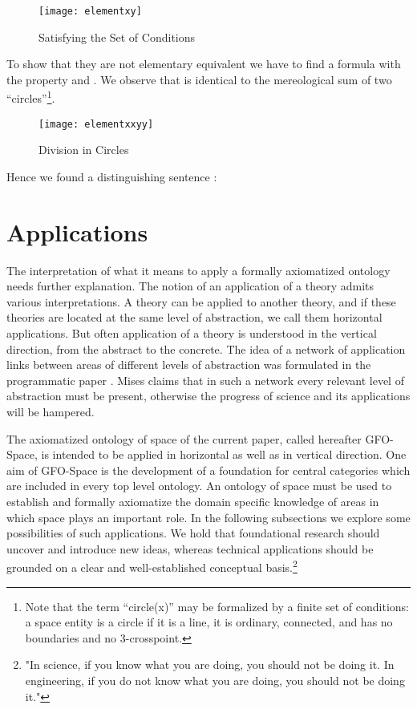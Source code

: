 \documentclass{ao2e}
\begin{document}
{\begin{figure}[H]
\centering
\texttt{[image: elementxy]}
\caption{Satisfying the Set of Conditions}
\label{SSP}
\end{figure}

To show that they are not elementary equivalent we have to find a formula  with the property  and . We observe that  is identical to the mereological sum of two ``circles''\footnote{Note that the term ``circle(x)'' may be formalized by a finite set of conditions: a space entity is a circle if it is a line, it is ordinary, connected, and has no boundaries and no 3-crosspoint.}.


\begin{figure}[H]
\centering
\texttt{[image: elementxxyy]}
\caption{Division in Circles}
\label{SSP}
\end{figure}

Hence we found a distinguishing sentence :

\noindent  








\section{Applications}

The interpretation of what it means to apply a formally axiomatized ontology needs further explanation.
The notion of an application of a theory admits various interpretations. A theory can be applied to another theory, and if these theories are located at the same level of abstraction, we call them horizontal applications. But often application of a theory is understood in the vertical direction, from the abstract to the concrete. The idea of a network of application links between areas of different levels of abstraction was formulated in the programmatic paper \cite{mises-r-1921-a}. Mises claims that in such a network every relevant level of abstraction must be present, otherwise the progress of science and its applications will be hampered.

The axiomatized ontology of space of the current paper, called hereafter GFO-Space, is intended
to be applied in horizontal as well as in vertical direction. One aim of GFO-Space is the development of a foundation for central categories which are included in every top level ontology.
An ontology of space must be used to establish and formally axiomatize the domain specific knowledge of areas in which space plays an important role. In the following subsections we explore some possibilities of such applications. We hold that foundational research should uncover and introduce new ideas, whereas technical applications should be grounded on a clear and well-established conceptual basis.\footnote{\cite{hamming-w-1997-a}
"In science, if you know what you are doing, you should not be doing it. In engineering, if you do not know what you are doing, you should not be doing it."}




}
\end{document}
